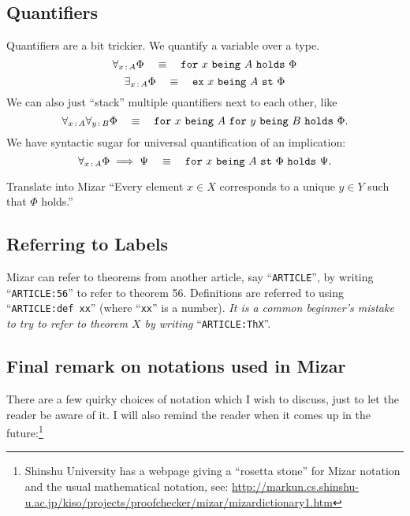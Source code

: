 \subsection{Quantifiers}
Quantifiers are a bit trickier. We quantify a variable over a type.
\begin{equation}
\forall_{x\mathop{:}\nolimits A}\Phi\quad\equiv\quad\mathtt{for}~x~\mathtt{being}~A~\mathtt{holds}~\Phi
\end{equation}
\begin{equation}
\exists_{x\mathop{:}\nolimits A}\Phi\quad\equiv\quad\mathtt{ex}~x~\mathtt{being}~A~\mathtt{st}~\Phi
\end{equation}
We can also just ``stack'' multiple quantifiers next to each other, like
\begin{equation}
\forall_{x\mathop{:}\nolimits A}\forall_{y\mathop{:}\nolimits B}\Phi\quad\equiv\quad\mathtt{for}~x~\mathtt{being}~A~\mathtt{for}~y~\mathtt{being}~B~\mathtt{holds}~\Phi.
\end{equation}
We have syntactic sugar for universal quantification of an implication:
\begin{equation}
\forall_{x\mathop{:}\nolimits A}\Phi\implies\Psi\quad\equiv\quad\mathtt{for}~x~\mathtt{being}~A~\mathtt{st}~\Phi~\mathtt{holds}~\Psi.
\end{equation}

\begin{exercise}
  Translate into Mizar ``Every element $x\in X$ corresponds to a unique
  $y\in Y$ such that $\Phi$ holds.''
\end{exercise}

\subsection{Referring to Labels}\label{par:introduction:referring-to-labels}
Mizar can refer to theorems from another article, say
``\verb#ARTICLE#'', by writing ``\verb#ARTICLE:56#'' to refer to theorem 56.
Definitions are referred to using ``\verb#ARTICLE:def xx#'' (where
``\verb#xx#'' is a number). \emph{It is a common beginner's mistake to
try to refer to theorem $X$ by writing } ``\verb#ARTICLE:ThX#''.

\subsection{Final remark on notations used in Mizar}
There are a few quirky choices of notation which I wish to discuss, just
to let the reader be aware of it. I will also remind the reader when it
comes up in the future:\footnote{Shinshu University has a webpage giving
a ``rosetta stone'' for Mizar notation and the usual mathematical
notation, see: \url{http://markun.cs.shinshu-u.ac.jp/kiso/projects/proofchecker/mizar/mizardictionary1.htm}}

